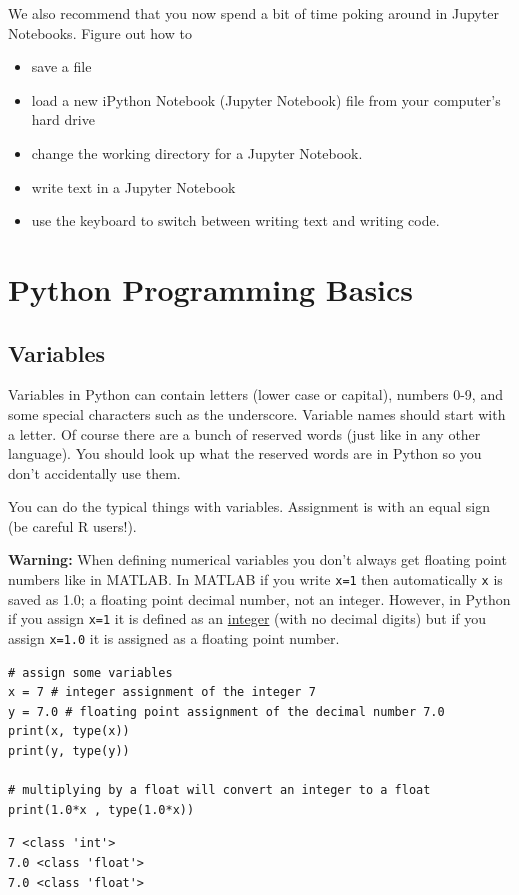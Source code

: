 We also recommend that you now spend a bit of time poking around in Jupyter Notebooks.
Figure out how to 
\begin{itemize}
    \item save a file
    \item load a new iPython Notebook (Jupyter Notebook) file from your computer's hard drive
    \item change the working directory for a Jupyter Notebook.
    \item write text in a Jupyter Notebook
    \item use the keyboard to switch between writing text and writing code.
\end{itemize}

\section{Python Programming Basics}
\subsection{Variables}
Variables in Python can contain letters (lower case or capital), numbers 0-9, and some
special characters such as the underscore. Variable names should start with a letter. Of
course there are a bunch of reserved words (just like in any other language). You should
look up what the reserved words are in Python so you don't accidentally use them.

You can do the typical things with variables. Assignment is with an equal sign (be careful
R users!).

{\bf Warning:} When defining numerical variables you don't always get floating point
numbers like in MATLAB. In MATLAB if you write \texttt{x=1} then automatically \texttt{x}
is saved as 1.0; a floating point decimal number, not an integer. However, in Python if
you assign \texttt{x=1} it is defined as an \underline{integer} (with no decimal digits)
but if you assign \texttt{x=1.0} it is assigned as a floating point number.

\begin{example}

\bcode    
\begin{lstlisting}
# assign some variables
x = 7 # integer assignment of the integer 7
y = 7.0 # floating point assignment of the decimal number 7.0
print(x, type(x))
print(y, type(y))

# multiplying by a float will convert an integer to a float
print(1.0*x , type(1.0*x)) 
\end{lstlisting}
\boutput
\begin{lstlisting}
7 <class 'int'>
7.0 <class 'float'>
7.0 <class 'float'>
\end{lstlisting}
\end{example}


